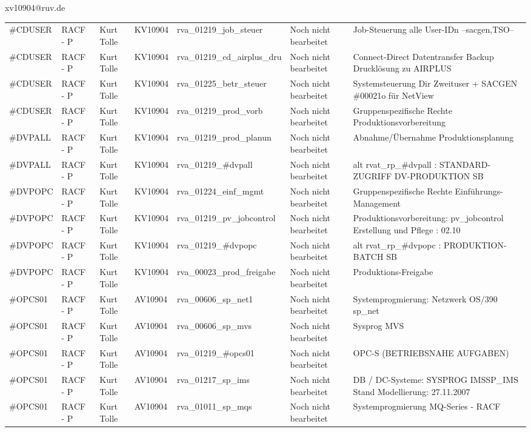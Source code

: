 \documentclass[a4paper,landscape,12pt]{letter}
\begin{document}
\begin{letter}{xv10904@ruv.de\hfill \break}
\begin{tiny}
\begin{longtable}{|p{35mm}|p{15mm}|p{25mm}|p{10mm}|p{40mm}|p{50mm}|p{50mm}|}
\#CDUSER & RACF - P & Kurt Tolle & KV10904 & rva\_01219\_job\_steuer & Noch nicht bearbeitet & Job-Steuerung alle User-IDn --sacgen,TSO-- \\
\#CDUSER & RACF - P & Kurt Tolle & KV10904 & rva\_01219\_cd\_airplus\_dru & Noch nicht bearbeitet & Connect-Direct Datentransfer Backup Drucklösung zu AIRPLUS \\
\#CDUSER & RACF - P & Kurt Tolle & KV10904 & rva\_01225\_betr\_steuer & Noch nicht bearbeitet & Systemsteuerung Dir Zweituser + SACGEN \#00021o für NetView \\
\#CDUSER & RACF - P & Kurt Tolle & KV10904 & rva\_01219\_prod\_vorb & Noch nicht bearbeitet & Gruppenspezifische Rechte Produktionsvorbereitung \\
\#DVPALL & RACF - P & Kurt Tolle & KV10904 & rva\_01219\_prod\_planun & Noch nicht bearbeitet & Abnahme/Übernahme Produktionsplanung \\
\#DVPALL & RACF - P & Kurt Tolle & KV10904 & rva\_01219\_\#dvpall & Noch nicht bearbeitet & alt rvat\_rp\_\#dvpall          : STANDARD-ZUGRIFF DV-PRODUKTION SB \\
\#DVPOPC & RACF - P & Kurt Tolle & KV10904 & rva\_01224\_einf\_mgmt & Noch nicht bearbeitet & Gruppenspezifische Rechte Einführungs-Management \\
\#DVPOPC & RACF - P & Kurt Tolle & KV10904 & rva\_01219\_pv\_jobcontrol & Noch nicht bearbeitet & Produktionsvorbereitung: pv\_jobcontrol Erstellung und Pflege : 02.10 \\
\#DVPOPC & RACF - P & Kurt Tolle & KV10904 & rva\_01219\_\#dvpopc & Noch nicht bearbeitet & alt rvat\_rp\_\#dvpopc          : PRODUKTION-BATCH SB \\
\#DVPOPC & RACF - P & Kurt Tolle & KV10904 & rva\_00023\_prod\_freigabe & Noch nicht bearbeitet & Produktions-Freigabe \\
\#OPCS01 & RACF - P & Kurt Tolle & AV10904 & rva\_00606\_sp\_net1 & Noch nicht bearbeitet & Systemprogmierung: Netzwerk OS/390 sp\_net \\
\#OPCS01 & RACF - P & Kurt Tolle & AV10904 & rva\_00606\_sp\_mvs & Noch nicht bearbeitet & Sysprog MVS \\
\#OPCS01 & RACF - P & Kurt Tolle & AV10904 & rva\_01219\_\#opcs01 & Noch nicht bearbeitet & OPC-S (BETRIEBSNAHE AUFGABEN) \\
\#OPCS01 & RACF - P & Kurt Tolle & AV10904 & rva\_01217\_sp\_ims & Noch nicht bearbeitet & DB / DC-Systeme:  SYSPROG IMSSP\_IMS Stand Modellierung: 27.11.2007 \\
\#OPCS01 & RACF - P & Kurt Tolle & AV10904 & rva\_01011\_sp\_mqs & Noch nicht bearbeitet & Systemprogmierung MQ-Series - RACF \\

\end{longtable}
\end{tiny}
\end{letter}
\end{document}
